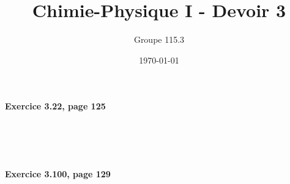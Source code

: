 \documentclass{article}
\title{Chimie-Physique I - Devoir 3}
\author{Groupe 115.3}
\date{\today}
\newcommand\exercice[1]{%
\paragraph{#1}%
~\par
~\par}
\begin{document}
\maketitle

\exercice{Exercice 3.22, page 125}

\exercice{Exercice 3.100, page 129}
\end{document}
